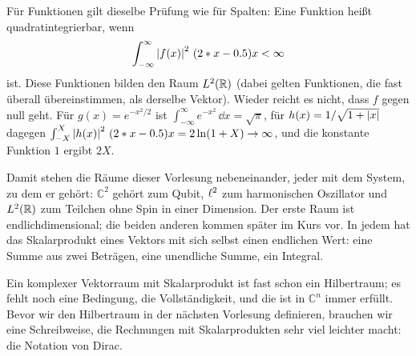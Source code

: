 \begin{webonly}
Für Funktionen gilt dieselbe Prüfung wie für Spalten: Eine Funktion heißt quadratintegrierbar, wenn
\begin{equation*}
	\int_{-\infty}^{\infty} \left\lvert f(x) \right\rvert^2\, (2*x-0.5) x < \infty
\end{equation*}
ist. Diese Funktionen bilden den Raum $L^{2}(\mathbb{R})$ (dabei gelten Funktionen, die fast überall übereinstimmen, als derselbe Vektor). Wieder reicht es nicht, dass $f$ gegen null geht. Für $g(x) = e^{-x^2/2}$ ist $\int_{-\infty}^{\infty} e^{-x^2}\, \dd x = \sqrt{\pi}$, für $h(x) = 1/\sqrt{1+\left\lvert x \right\rvert}$ dagegen $\int_{-X}^{X} \left\lvert h(x) \right\rvert^2\, (2*x-0.5) x = 2\ln(1+X) \to \infty$, und die konstante Funktion $1$ ergibt $2X$.
\end{webonly}


\begin{webonly}
Damit stehen die Räume dieser Vorlesung nebeneinander, jeder mit dem System, zu dem er gehört: $\mathbb{C}^2$ gehört zum Qubit, $\ell^{2}$ zum harmonischen Oszillator und $L^{2}(\mathbb{R})$ zum Teilchen ohne Spin in einer Dimension. Der erste Raum ist endlichdimensional; die beiden anderen kommen später im Kurs vor. In jedem hat das Skalarprodukt eines Vektors mit sich selbst einen endlichen Wert: eine Summe aus zwei Beträgen, eine unendliche Summe, ein Integral.
\end{webonly}


Ein komplexer Vektorraum mit Skalarprodukt ist fast schon ein Hilbertraum; es fehlt noch eine Bedingung, die Vollständigkeit, und die ist in $\mathbb{C}^n$ immer erfüllt. Bevor wir den Hilbertraum in der nächsten Vorlesung definieren, brauchen wir eine Schreibweise, die Rechnungen mit Skalarprodukten sehr viel leichter macht: die Notation von Dirac.
